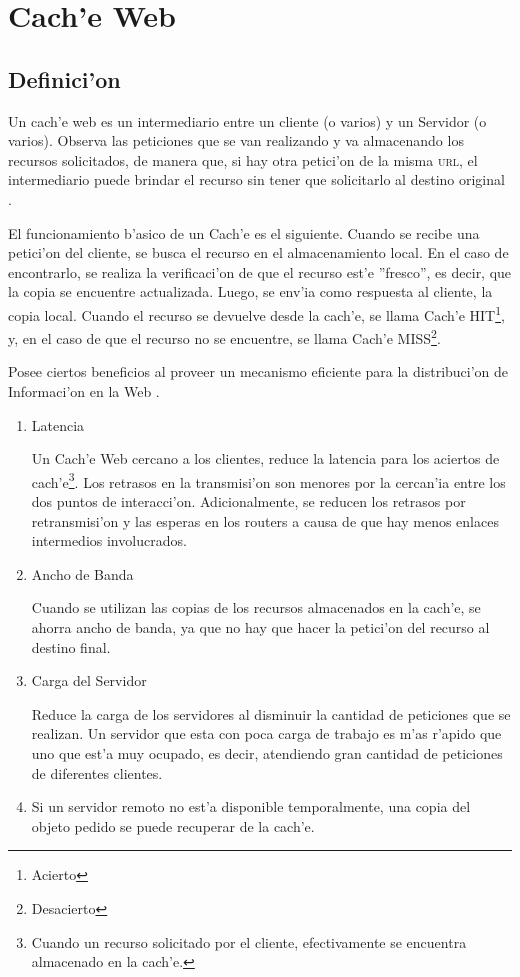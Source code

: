 \chapter{Cach'e Web}
\label{cache}
\section{Definici'on}

Un cach'e web es un intermediario entre un cliente (o varios) y un Servidor (o varios). Observa las peticiones que se van realizando y va almacenando los recursos solicitados, de manera que, si hay otra petici'on de la misma \textsc{url}, el intermediario puede brindar el recurso sin tener que solicitarlo al destino original \citep{cacheDef}.

El funcionamiento b'asico de un Cach'e es el siguiente. Cuando se recibe una petici'on del cliente, se busca el recurso en el almacenamiento local. En el caso de encontrarlo, se realiza la verificaci'on de que el recurso est'e ''fresco'', es decir, que la copia se encuentre actualizada. Luego, se env'ia como respuesta al cliente, la copia local. Cuando el recurso se devuelve desde la cach'e, se llama Cach'e HIT\footnote{Acierto}, y, en el caso de que el recurso no se encuentre, se llama Cach'e MISS\footnote{Desacierto}.
\vspace{5mm}

Posee ciertos beneficios al proveer un mecanismo eficiente para la distribuci'on de Informaci'on en la Web \citep[p. 20]{webCaching}.
\begin{enumerate}
\item Latencia

Un Cach'e Web cercano a los clientes, reduce la latencia para los aciertos de cach'e\footnote{Cuando un recurso solicitado por el cliente, efectivamente se encuentra almacenado en la cach'e.}. Los retrasos en la transmisi'on son menores por la cercan'ia entre los dos puntos de interacci'on. Adicionalmente, se reducen los retrasos por retransmisi'on y las esperas en los routers a causa de que hay menos enlaces intermedios involucrados.
\item Ancho de Banda

Cuando se utilizan las copias de los recursos almacenados en la cach'e, se ahorra ancho de banda, ya que no hay que hacer la petici'on del recurso al destino final.
\item Carga del Servidor

Reduce la carga de los servidores al disminuir la cantidad de peticiones que se realizan. Un servidor que esta con poca carga de trabajo es m'as r'apido que uno que est'a muy ocupado, es decir, atendiendo gran cantidad de peticiones de diferentes clientes.

\item Si un servidor remoto no est'a disponible temporalmente, una copia del objeto pedido se puede recuperar de la cach'e.
\end{enumerate}

